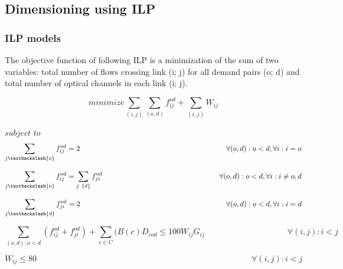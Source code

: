 \subsection{Dimensioning using ILP}

\subsubsection{ILP models}\label{ILP_models_OP}
The objective function of following ILP is a minimization of the sum of two variables: total number of flows crossing link (i; j) for all demand pairs (o; d) and total number of optical channels in each link (i; j).

\begin{equation}
minimize    \sum_{(i,j)} \sum_{(o,d)} f_{ij}^{od} + \sum_{(i,j)} W_{ij}
\label{ILPOpaque}
\end{equation}

$subject$ $to$
\begin{equation}
\sum_{j\textbackslash \{o\}} f_{ij}^{od} = 2  \qquad \qquad \qquad \qquad \qquad \qquad \qquad \qquad \qquad \qquad
\forall(o,d) : o < d, \forall i: i = o
\label{ILPOpaque1}
\end{equation}

\vspace{-5pt}
\begin{equation}
\sum_{j\textbackslash \{o\}} f_{ij}^{od} = \sum_{j\ \{d\}} f_{ji}^{od}   \qquad \qquad \qquad \qquad \qquad \qquad \qquad \qquad
\forall(o,d) : o < d, \forall i: i \neq o,d
\label{ILPOpaque2}
\end{equation}

\vspace{-5pt}
\begin{equation}
\sum_{j\textbackslash \{d\}} f_{ji}^{od} = 2  \qquad \qquad \qquad \qquad \qquad \qquad \qquad \qquad \qquad \qquad
\forall(o,d) : o < d, \forall i: i = d
\label{ILPOpaque3}
\end{equation}

\vspace{-5pt}
\begin{equation}
\sum_{(o,d):o<d} \left(f_{ij}^{od} + f_{ji}^{od}\right) + \sum_{c\in C} (B\left(c\right) D_{cod}\leq100 W_{ij} G_{ij} \qquad \qquad \qquad \qquad \qquad
\forall(i,j) : i < j
\label{ILPOpaque4}
\end{equation}

\vspace{-5pt}
\begin{equation}
W_{ij} \leq 80 \qquad  \qquad \qquad \qquad \qquad \qquad \qquad \qquad \qquad \qquad \qquad \qquad \qquad \forall(i,j) : i < j
\label{ILPOpaque5}
\end{equation}

